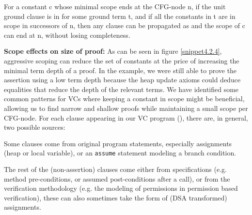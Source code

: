 For a constant c whose minimal scope ends at the CFG-node n, if the unit ground clause  is in  for some ground term t, and if all the constants in t are in scope in successors of n, then any clause  can be propagated as  and the scope of c can end at n, without losing completeness.


\textbf{Scope effects on size of proof:}
As can be seen in figure \ref{snippet4.2.4}, aggressive scoping can reduce the set of constants at the price of increasing the minimal term depth of a proof. In the example, we were still able to prove the assertion using a low term depth because the heap update axioms could deduce equalities that reduce the depth of the relevant terms.
We have identified some common patterns for VCs where keeping a constant in scope might be beneficial, allowing us to find narrow and shallow proofs while maintaining a small scope per CFG-node.
For each clause appearing in our VC program (), there are, in general, two possible sources:

Some clauses come from original program statements, especially assignments (heap or local variable), or an \lstinline|assume| statement modeling a branch condition.

The rest of the (non-assertion) clauses come either from specifications (e.g. method pre-conditions, or assumed post-conditions after a call), or from the verification methodology (e.g. the modeling of permissions in permission based verification), these can also sometimes take the form of (DSA transformed) assignments.

